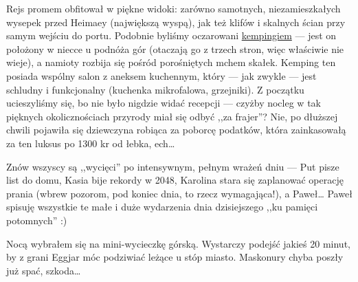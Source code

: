 
Rejs promem obfitował w piękne widoki: zarówno samotnych, niezamieszkałych wysepek przed Heimaey (największą wyspą), jak też klifów i skalnych ścian przy samym wejściu do portu. Podobnie byliśmy oczarowani \href{http://www.tjalda.is/en/herjolfsdalur/}{kempingiem} --- jest on położony w niecce u podnóża gór (otaczają go z trzech stron, więc właściwie nie wieje), a namioty rozbija się pośród porośniętych mchem skałek. Kemping ten posiada wspólny salon z aneksem kuchennym, który --- jak zwykle --- jest schludny i funkcjonalny (kuchenka mikrofalowa, grzejniki). Z początku ucieszyliśmy się, bo nie było nigdzie widać recepcji --- czyżby nocleg w tak pięknych okolicznościach przyrody miał się odbyć ,,za frajer''? Nie, po dłuższej chwili pojawiła się dziewczyna robiąca za poborcę podatków, która zainkasowałą za ten luksus po 1300 kr od łebka, ech…


Znów wszyscy są ,,wycięci'' po intensywnym, pełnym wrażeń dniu --- Put pisze list do domu, Kasia bije rekordy w 2048, Karolina stara się zaplanować operację prania (wbrew pozorom, pod koniec dnia, to rzecz wymagająca!), a Paweł… Paweł spisuję wszystkie te małe i duże wydarzenia dnia dzisiejszego ,,ku pamięci potomnych'' :)

Nocą wybrałem się na mini-wycieczkę górską. Wystarczy podejść jakieś 20 minut, by z grani Eggjar móc podziwiać leżące u stóp miasto. Maskonury chyba poszły już spać, szkoda…